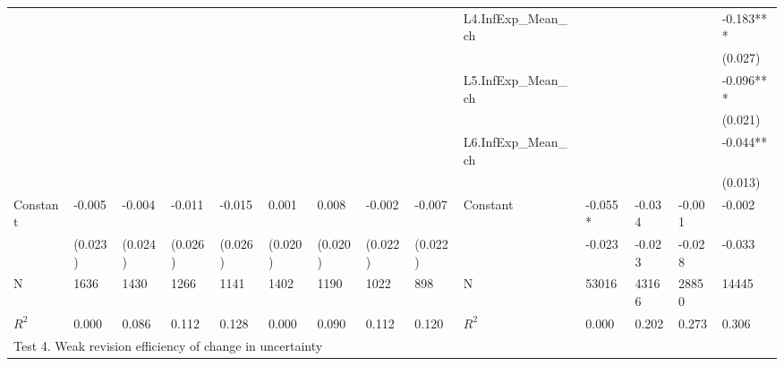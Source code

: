 \documentclass[]{article}
\begin{document}
\begin{table}
\begin{adjustbox}{width={24cm},totalheight={14cm}}
\begin{threeparttable}
\begin{tabular}{llllllllllllll}
					&             &           &           &           &               &           &           &           & L4.InfExp\_Mean\_ch &         &           &           & -0.183*** \\
					
					&             &           &           &           &               &           &           &           &                                 &         &           &           & (0.027)    \\
					&             &           &           &           &               &           &           &           & L5.InfExp\_Mean\_ch &         &           &           & -0.096*** \\
					&             &           &           &           &               &           &           &           &                      &         &           &           & (0.021)    \\
					&             &           &           &           &               &           &           &           & L6.InfExp\_Mean\_ch &         &           &           & -0.044**  \\
					&             &           &           &           &               &           &           &           &                                     &         &           &           & (0.013)    \\
					Constant               & -0.005      & -0.004    & -0.011    & -0.015    & 0.001         & 0.008     & -0.002    & -0.007    & Constant              & -0.055* & -0.034    & -0.001    & -0.002    \\
					& (0.023)     & (0.024)   & (0.026)   & (0.026)   & (0.020)       & (0.020)   & (0.022)   & (0.022)   &                                 & -0.023  & -0.023    & -0.028    & -0.033    \\
					\hline 
					N                    & 1636        & 1430      & 1266      & 1141      & 1402          & 1190      & 1022      & 898       & N                   & 53016   & 43166     & 28850     & 14445     \\
					$R^2$                  & 0.000       & 0.086     & 0.112     & 0.128     & 0.000         & 0.090     & 0.112     & 0.120     & $R^2$ &  0.000       & 0.202     & 0.273     & 0.306   \\
					\hline 
					\multicolumn{14}{l}{Test 4. Weak revision efficiency of change in uncertainty}                \\
					\hline                                                                                                                 

\end{tabular}
\end{threeparttable}
\end{adjustbox}
\end{table}
\end{document}
